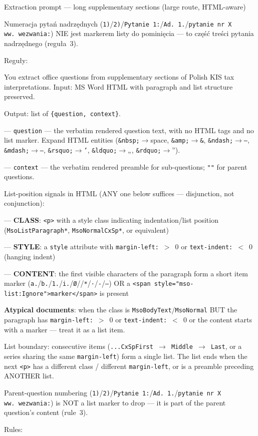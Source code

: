 \begin{promptbox}{Extraction prompt --- long supplementary sections (large route, HTML-aware)}
{Numeracja pytań nadrzędnych (\texttt{1)}/\texttt{2)}/\texttt{Pytanie~1:}/\texttt{Ad.~1.}/\texttt{pytanie nr~X ww.\ wezwania:}) NIE jest markerem listy do pominięcia --- to część treści pytania nadrzędnego (reguła~3).\par\smallskip
Reguły:%
}{%
You extract office questions from supplementary sections of Polish KIS tax interpretations. Input: MS Word HTML with paragraph and list structure preserved.\par\smallskip
Output: list of \texttt{\{question, context\}}.\par
--- \texttt{question} --- the verbatim rendered question text, with no HTML tags and no list marker. Expand HTML entities (\texttt{\&nbsp;}$\to$space, \texttt{\&amp;}$\to$\texttt{\&}, \texttt{\&ndash;}$\to$\texttt{--}, \texttt{\&mdash;}$\to$\texttt{---}, \texttt{\&rsquo;}$\to$\texttt{'}, \texttt{\&ldquo;}$\to$„, \texttt{\&rdquo;}$\to$'').\par
--- \texttt{context} --- the verbatim rendered preamble for sub-questions; \texttt{""} for parent questions.\par\smallskip
List-position signals in HTML (ANY one below suffices --- disjunction, not conjunction):\par
--- \textbf{CLASS}: \texttt{<p>} with a style class indicating indentation/list position (\texttt{MsoListParagraph*}, \texttt{MsoNormalCxSp*}, or equivalent)\par
--- \textbf{STYLE}: a \texttt{style} attribute with \texttt{margin-left:}~$>$~0 or \texttt{text-indent:}~$<$~0 (hanging indent)\par
--- \textbf{CONTENT}: the first visible characters of the paragraph form a short item marker (\texttt{a.}/\texttt{b.}/\texttt{1.}/\texttt{i.}/\texttt{Ø}/\texttt{\textbullet}/\texttt{*}/\texttt{·}/\texttt{-}/\texttt{--}) OR a \texttt{<span style="mso-list:Ignore">marker</span>} is present\par\smallskip
\textbf{Atypical documents}: when the class is \texttt{MsoBodyText}/\texttt{MsoNormal} BUT the paragraph has \texttt{margin-left:}~$>$~0 or \texttt{text-indent:}~$<$~0 or the content starts with a marker --- treat it as a list item.\par\smallskip
List boundary: consecutive items (\texttt{...CxSpFirst $\to$ Middle $\to$ Last}, or a series sharing the same \texttt{margin-left}) form a single list. The list ends when the next \texttt{<p>} has a different class / different \texttt{margin-left}, or is a preamble preceding ANOTHER list.\par\smallskip
Parent-question numbering (\texttt{1)}/\texttt{2)}/\texttt{Pytanie~1:}/\texttt{Ad.~1.}/\texttt{pytanie nr~X ww.\ wezwania:}) is NOT a list marker to drop --- it is part of the parent question's content (rule~3).\par\smallskip
Rules:%
}


\end{promptbox}
